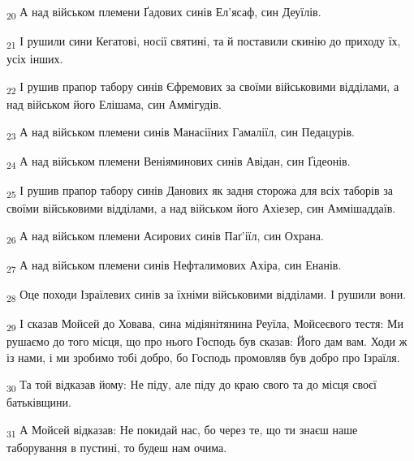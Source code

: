 \begin{tcolorbox}
\textsubscript{20} А над військом племени Ґадових синів Ел'ясаф, син Деуїлів.
\end{tcolorbox}
\begin{tcolorbox}
\textsubscript{21} І рушили сини Кегатові, носії святині, та й поставили скинію до приходу їх, усіх інших.
\end{tcolorbox}
\begin{tcolorbox}
\textsubscript{22} І рушив прапор табору синів Єфремових за своїми військовими відділами, а над військом його Елішама, син Аммігудів.
\end{tcolorbox}
\begin{tcolorbox}
\textsubscript{23} А над військом племени синів Манасіїних Гамаліїл, син Педацурів.
\end{tcolorbox}
\begin{tcolorbox}
\textsubscript{24} А над військом племени Веніяминових синів Авідан, син Ґідеонів.
\end{tcolorbox}
\begin{tcolorbox}
\textsubscript{25} І рушив прапор табору синів Данових як задня сторожа для всіх таборів за своїми військовими відділами, а над військом його Ахіезер, син Аммішаддаїв.
\end{tcolorbox}
\begin{tcolorbox}
\textsubscript{26} А над військом племени Асирових синів Паґ'іїл, син Охрана.
\end{tcolorbox}
\begin{tcolorbox}
\textsubscript{27} А над військом племени синів Нефталимових Ахіра, син Енанів.
\end{tcolorbox}
\begin{tcolorbox}
\textsubscript{28} Оце походи Ізраїлевих синів за їхніми військовими відділами. І рушили вони.
\end{tcolorbox}
\begin{tcolorbox}
\textsubscript{29} І сказав Мойсей до Ховава, сина мідіянітянина Реуїла, Мойсеєвого тестя: Ми рушаємо до того місця, що про нього Господь був сказав: Його дам вам. Ходи ж із нами, і ми зробимо тобі добро, бо Господь промовляв був добро про Ізраїля.
\end{tcolorbox}
\begin{tcolorbox}
\textsubscript{30} Та той відказав йому: Не піду, але піду до краю свого та до місця своєї батьківщини.
\end{tcolorbox}
\begin{tcolorbox}
\textsubscript{31} А Мойсей відказав: Не покидай нас, бо через те, що ти знаєш наше таборування в пустині, то будеш нам очима.
\end{tcolorbox}
